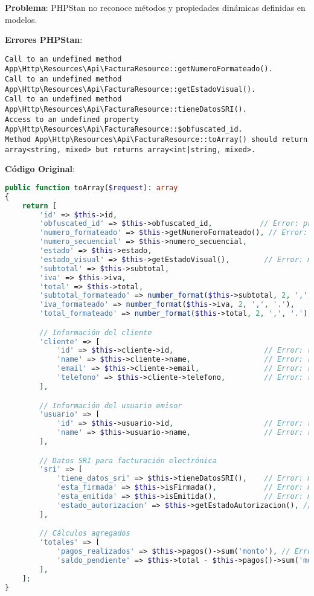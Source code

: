 \documentclass[12pt,a4paper]{article}
\begin{document}
\textbf{Problema}: PHPStan no reconoce métodos y propiedades dinámicas definidas en modelos.

\textbf{Errores PHPStan}:
\begin{lstlisting}[caption=Errores múltiples en FacturaResource.php]
Call to an undefined method App\Http\Resources\Api\FacturaResource::getNumeroFormateado().
Call to an undefined method App\Http\Resources\Api\FacturaResource::getEstadoVisual().
Call to an undefined method App\Http\Resources\Api\FacturaResource::tieneDatosSRI().
Access to an undefined property App\Http\Resources\Api\FacturaResource::$obfuscated_id.
Method App\Http\Resources\Api\FacturaResource::toArray() should return
array<string, mixed> but returns array<int|string, mixed>.
\end{lstlisting}

\textbf{Código Original}:
\begin{lstlisting}[language=php, caption=FacturaResource.php - Métodos y propiedades dinámicas]
public function toArray($request): array
{
    return [
        'id' => $this->id,
        'obfuscated_id' => $this->obfuscated_id,           // Error: propiedad dinámica
        'numero_formateado' => $this->getNumeroFormateado(), // Error: método dinámico
        'numero_secuencial' => $this->numero_secuencial,
        'estado' => $this->estado,
        'estado_visual' => $this->getEstadoVisual(),        // Error: método dinámico
        'subtotal' => $this->subtotal,
        'iva' => $this->iva,
        'total' => $this->total,
        'subtotal_formateado' => number_format($this->subtotal, 2, ',', '.'),
        'iva_formateado' => number_format($this->iva, 2, ',', '.'),
        'total_formateado' => number_format($this->total, 2, ',', '.'),

        // Información del cliente
        'cliente' => [
            'id' => $this->cliente->id,                     // Error: relación
            'name' => $this->cliente->name,                 // Error: relación
            'email' => $this->cliente->email,               // Error: relación
            'telefono' => $this->cliente->telefono,         // Error: relación
        ],

        // Información del usuario emisor
        'usuario' => [
            'id' => $this->usuario->id,                     // Error: relación
            'name' => $this->usuario->name,                 // Error: relación
        ],

        // Datos SRI para facturación electrónica
        'sri' => [
            'tiene_datos_sri' => $this->tieneDatosSRI(),    // Error: método dinámico
            'esta_firmada' => $this->isFirmada(),           // Error: método dinámico
            'esta_emitida' => $this->isEmitida(),           // Error: método dinámico
            'estado_autorizacion' => $this->getEstadoAutorizacion(), // Error: método dinámico
        ],

        // Cálculos agregados
        'totales' => [
            'pagos_realizados' => $this->pagos()->sum('monto'), // Error: método de relación
            'saldo_pendiente' => $this->total - $this->pagos()->sum('monto'),
        ],
    ];
}
\end{lstlisting}
\end{document}
